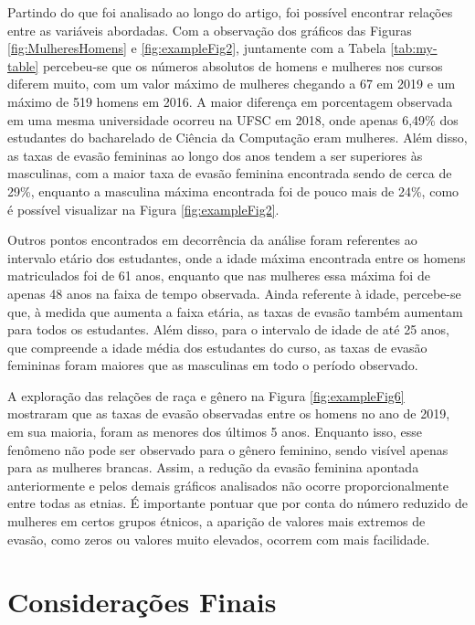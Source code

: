 \documentclass[a4paper]{article}
\begin{document}
Partindo do que foi analisado ao longo do artigo, foi possível encontrar relações entre as variáveis abordadas. Com a observação dos gráficos das Figuras \ref{fig:MulheresHomens} e \ref{fig:exampleFig2}, juntamente com a Tabela \ref{tab:my-table} percebeu-se que os números absolutos de homens e mulheres nos cursos diferem muito, com um valor máximo de mulheres chegando a 67 em 2019 e um máximo de 519 homens em 2016. A maior diferença em porcentagem observada em uma mesma universidade ocorreu na UFSC em 2018, onde apenas 6,49\% dos estudantes do bacharelado de Ciência da Computação eram mulheres. Além disso, as taxas de evasão femininas ao longo dos anos tendem a ser superiores às masculinas, com a maior taxa de evasão feminina encontrada sendo de cerca de 29\%, enquanto a masculina máxima encontrada foi de pouco mais de 24\%, como é possível visualizar na Figura \ref{fig:exampleFig2}.

Outros pontos encontrados em decorrência da análise foram referentes ao intervalo etário dos estudantes, onde a idade máxima encontrada entre os homens matriculados foi de 61 anos, enquanto que nas mulheres essa máxima foi de apenas 48 anos na faixa de tempo observada. Ainda referente à idade, percebe-se que, à medida que aumenta a faixa etária, as taxas de evasão também aumentam para todos os estudantes. Além disso, para o intervalo de idade de até 25 anos, que compreende a idade média dos estudantes do curso, as taxas de evasão femininas foram maiores que as masculinas em todo o período observado.

A exploração das relações de raça e gênero na Figura \ref{fig:exampleFig6} mostraram que as taxas de evasão observadas entre os homens no ano de 2019, em sua maioria, foram as menores dos últimos 5 anos. Enquanto isso, esse fenômeno não pode ser observado para o gênero feminino, sendo visível apenas para as mulheres brancas. Assim, a redução da evasão feminina apontada anteriormente e pelos demais gráficos analisados não ocorre proporcionalmente entre todas as etnias. É importante pontuar que por conta do número reduzido de mulheres em certos grupos étnicos, a aparição de valores mais extremos de evasão, como zeros ou valores muito elevados, ocorrem com mais facilidade.   






\section{Considerações Finais}\label{consideracoesfinais}
\end{document}
